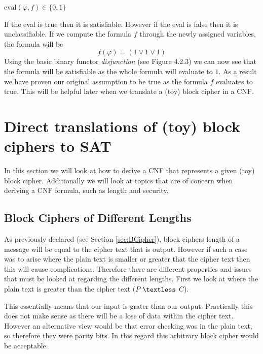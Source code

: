 \documentclass[11pt,a4paper, notitlepage]{report}
\begin{document}
\begin{center}
$\text{eval} (\varphi, f) \in \{0,1\}$
\end{center}
If the eval is true then it is satisfiable. However if the eval is false then it is unclassifiable.
If we compute the formula $f$ through the newly assigned variables, the formula will be
\begin{displaymath}
f(\varphi) = (1 \lor 1 \lor 1)
\end{displaymath}
Using the basic binary functor \emph{disjunction} (see Figure 4.2.3) we can now see that the formula will be satisfiable as the whole formula will evaluate to $1$. As a result we have proven our original assumption to be true as the formula $f$ evaluates to true. This will be helpful later when we translate a (toy) block cipher in a CNF. 
















\chapter{Direct translations of (toy) block ciphers to SAT}
\label{cha:dirtrans}

In this section we will look at how to derive a CNF that represents a given (toy) block cipher. Additionally we will look at topics that are of concern when deriving a CNF formula, such as length and security.

\section{Block Ciphers of Different Lengths}
\label{sec:Blockcipherdiff}

As previously declared (see Section \ref{sec:BCipher}), block ciphers length of a message will be equal to the cipher text that is output. However if such a case was to arise where the plain text is smaller or greater that the cipher text then this will cause complications. Therefore there are different properties and issues that must be looked at regarding the different lengths. First we look at where the plain text is greater than the cipher text ($P$ $\textless$ $C$). %

This essentially means that our input is grater than our output. Practically this does not make sense as there will be a lose of data within the cipher text.  However an alternative view would be that error checking was in the plain text, so therefore they were parity bits. In this regard this arbitrary block cipher would be acceptable.
\end{document}
